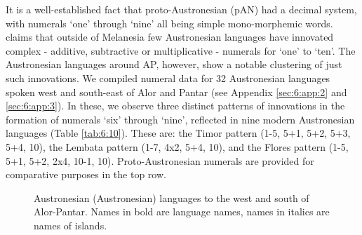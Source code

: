 It is a well-established fact that proto-Austronesian (pAN) had a decimal system, with numerals `one' through `nine' all being simple mono-morphemic words. \citet[268]{Blust2009} claims that outside of Melanesia few Austronesian languages have innovated complex - additive, subtractive or multiplicative - numerals for `one' to `ten'. The Austronesian languages around AP, however, show a notable clustering of just such innovations. We compiled numeral data for 32 Austronesian languages spoken west and south-east of Alor and Pantar (see Appendix \ref{sec:6:app:2} and \ref{sec:6:app:3}). In these, we observe three distinct patterns of innovations in the formation of numerals `six' through `nine', reflected in nine modern Austronesian languages (Table \ref{tab:6:10}). These are: the Timor pattern (1-5, 5+1, 5+2, 5+3, 5+4, 10), the Lembata pattern (1-7, 4x2, 5+4, 10), and the Flores pattern (1-5, 5+1, 5+2, 2x4, 10-1, 10). Proto-Austronesian numerals are provided for comparative purposes in the top row. 

\begin{figure}
\caption{Austronesian (Austronesian) languages to the west and south of Alor{}-Pantar. Names in bold are language names, names in italics are names of islands.}
\label{fig:6:1}
\end{figure}
 

